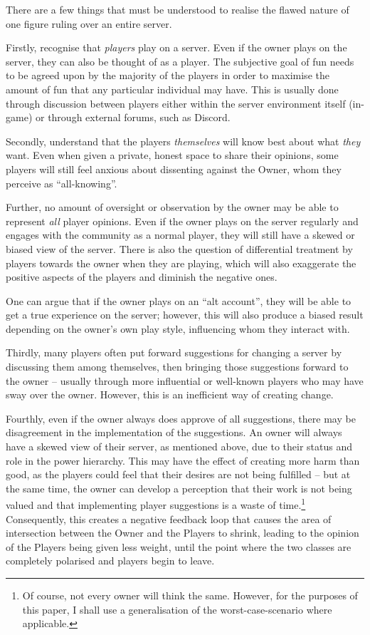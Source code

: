 There are a few things that must be understood to realise the flawed nature of one figure ruling over an entire server.

Firstly, recognise that \emph{players} play on a server. Even if the owner plays on the server, they can also be thought of as a player. The subjective goal of fun needs to be agreed upon by the majority of the players in order to maximise the amount of fun that any particular individual may have. This is usually done through discussion between players either within the server environment itself (in-game) or through external forums, such as Discord.

Secondly, understand that the players \emph{themselves} will know best about what \emph{they} want. Even when given a private, honest space to share their opinions, some players will still feel anxious about dissenting against the Owner, whom they perceive as “all-knowing”.

Further, no amount of oversight or observation by the owner may be able to represent \emph{all} player opinions. Even if the owner plays on the server regularly and engages with the community as a normal player, they will still have a skewed or biased view of the server. There is also the question of differential treatment by players towards the owner when they are playing, which will also exaggerate the positive aspects of the players and diminish the negative ones.

One can argue that if the owner plays on an “alt account”, they will be able to get a true experience on the server; however, this will also produce a biased result depending on the owner’s own play style, influencing whom they interact with.

Thirdly, many players often put forward suggestions for changing a server by discussing them among themselves, then bringing those suggestions forward to the owner – usually through more influential or well-known players who may have sway over the owner. However, this is an inefficient way of creating change.

Fourthly, even if the owner always does approve of all suggestions, there may be disagreement in the implementation of the suggestions. An owner will always have a skewed view of their server, as mentioned above, due to their status and role in the power hierarchy. This may have the effect of creating more harm than good, as the players could feel that their desires are not being fulfilled – but at the same time, the owner can develop a perception that their work is not being valued and that implementing player suggestions is a waste of time.\footnote{Of course, not every owner will think the same. However, for the purposes of this paper, I shall use a generalisation of the worst-case-scenario where applicable.} Consequently, this creates a negative feedback loop that causes the area of intersection between the Owner and the Players to shrink, leading to the opinion of the Players being given less weight, until the point where the two classes are completely polarised and players begin to leave.

